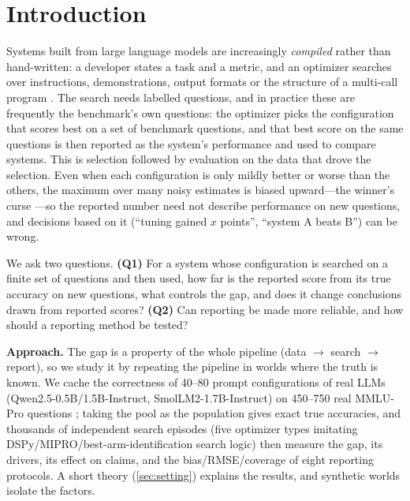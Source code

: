 \section{Introduction}
\label{sec:intro}
Systems built from large language models are increasingly \emph{compiled} rather than hand-written: a developer states a task and a metric, and an optimizer searches over instructions, demonstrations, output formats or the structure of a multi-call program \citep{khattab2023dspy,opsahl2024optimizing,zhou2023large,yang2024large,shi2024efficient}. The search needs labelled questions, and in practice these are frequently the benchmark's own questions: the optimizer picks the configuration that scores best on a set of benchmark questions, and that best score on the same questions is then reported as the system's performance and used to compare systems. This is selection followed by evaluation on the data that drove the selection. Even when each configuration is only mildly better or worse than the others, the maximum over many noisy estimates is biased upward---the winner's curse \citep{smith2006optimizer}---so the reported number need not describe performance on new questions, and decisions based on it (``tuning gained $x$ points'', ``system A beats B'') can be wrong.

We ask two questions. \textbf{(Q1)} For a system whose configuration is searched on a finite set of questions and then used, how far is the reported score from its true accuracy on new questions, what controls the gap, and does it change conclusions drawn from reported scores? \textbf{(Q2)} Can reporting be made more reliable, and how should a reporting method be tested?

\textbf{Approach.} The gap is a property of the whole pipeline (data $\to$ search $\to$ report), so we study it by repeating the pipeline in worlds where the truth is known. We cache the correctness of 40--80 prompt configurations of real LLMs (Qwen2.5-0.5B/1.5B-Instruct, SmolLM2-1.7B-Instruct) on 450--750 real MMLU-Pro questions \citep{wang2024mmlupro}; taking the pool as the population gives exact true accuracies, and thousands of independent search episodes (five optimizer types imitating DSPy/MIPRO/best-arm-identification search logic) then measure the gap, its drivers, its effect on claims, and the bias/RMSE/coverage of eight reporting protocols. A short theory (\cref{sec:setting}) explains the results, and synthetic worlds isolate the factors.

